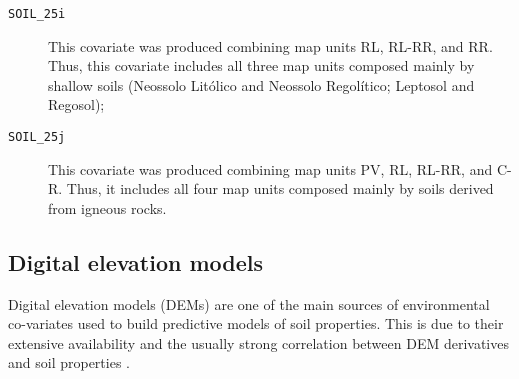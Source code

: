 \begin{description}
  \item[\texttt{SOIL\_25i}] This covariate was produced combining map units RL, RL-RR, and RR. Thus, this covariate includes all three map units composed mainly by shallow soils (Neossolo Litólico and Neossolo Regolítico; Leptosol and Regosol);
  
  \item[\texttt{SOIL\_25j}] This covariate was produced combining map units PV, RL, RL-RR, and C-R. Thus, it includes all four map units composed mainly by soils derived from igneous rocks.
\end{description}


\tocless\subsection{Digital elevation models}\label{sec:dem}

Digital elevation models (DEMs) are one of the main sources of environmental co-variates used to build predictive models of soil properties. This is due to their extensive availability and the usually strong correlation between DEM derivatives and soil properties \cite{BishopEtAl2006, Grunwald2009}.

